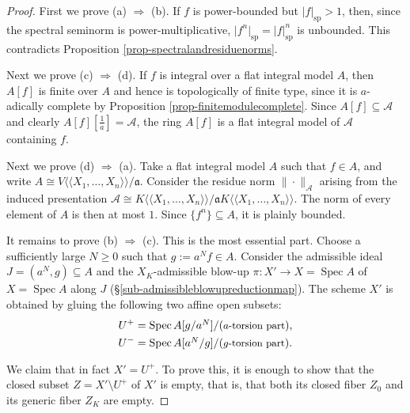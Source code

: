 \documentclass[a4paper,12pt, dvipdfmx]{jsbook}
\def\sp{\mathop{\mathrm{sp}}\nolimits}
\def\Spec{\mathop{\mathrm{Spec}}\nolimits}
\def\dl{\langle\!\langle}
\def\dr{\rangle\!\rangle}
\newcommand{\abs}[1]{\lvert#1\rvert}
\newcommand{\abss}[1]{\|#1\|}
\theoremstyle{plain}
\theoremstyle{definition}
\begin{document}
\begin{proof}[Proof]
First we prove (a) $\Rightarrow$ (b).
If $f$ is power-bounded but $\abs{f}_{\sp}>1$, then, since the spectral seminorm is power-multiplicative, $\abs{f^n}_{\sp}=\abs{f}^n_{\sp}$ is unbounded. This contradicts Proposition \ref{prop-spectralandresiduenorms}.

Next we prove (c) $\Rightarrow$ (d).
If $f$ is integral over a flat integral model $A$, then $A[f]$ is finite over $A$ and hence is topologically of finite type, since it is $a$-adically complete by Proposition \ref{prop-finitemodulecomplete}.
Since $A[f]\subseteq\mathcal{A}$ and clearly $A[f][\frac{1}{a}]=\mathcal{A}$, the ring $A[f]$ is a flat integral model of $\mathcal{A}$ containing $f$.

Next we prove (d) $\Rightarrow$ (a).
Take a flat integral model $A$ such that $f\in A$, and write $A\cong V\dl X_1,\ldots,X_n\dr/\mathfrak{a}$.
Consider the residue norm $\abss{\cdot}_{\mathcal{A}}$ arising from the induced presentation $\mathcal{A}\cong K\dl X_1,\ldots,X_n\dr/\mathfrak{a}K\dl X_1,\ldots,X_n\dr$. The norm of every element of $A$ is then at most $1$.
Since $\{f^n\}\subseteq A$, it is plainly bounded.

It remains to prove (b) $\Rightarrow$ (c). This is the most essential part.
Choose a sufficiently large $N\geq 0$ such that $g:=a^Nf\in A$.
Consider the admissible ideal $J=(a^N,g)\subseteq A$ and the $X_K$-admissible blow-up $\pi\colon X'\rightarrow X=\Spec A$ of $X=\Spec A$ along $J$ (\S\ref{sub-admissibleblowupreductionmap}).
The scheme $X'$ is obtained by gluing the following two affine open subsets:
\begin{equation*}
\begin{split}
U^+&=\Spec A[{\textstyle g/a^N}]/(\textrm{{\small $a$-torsion part}}),\\
U^-&=\Spec A[{\textstyle a^N/g}]/(\textrm{{\small $g$-torsion part}}).
\end{split}
\end{equation*}

We claim that in fact $X'=U^+$.
To prove this, it is enough to show that the closed subset $Z=X'\setminus U^+$ of $X'$ is empty, that is, that both its closed fiber $Z_0$ and its generic fiber $Z_K$ are empty.


\end{proof}
\end{document}

